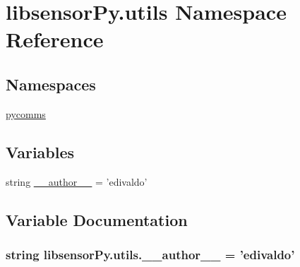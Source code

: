\hypertarget{namespacelibsensorPy_1_1utils}{}\section{libsensor\+Py.\+utils Namespace Reference}
\label{namespacelibsensorPy_1_1utils}
\subsection*{Namespaces}
\begin{DoxyCompactItemize}
\item 
 \hyperlink{namespacelibsensorPy_1_1utils_1_1pycomms}{pycomms}
\end{DoxyCompactItemize}
\subsection*{Variables}
\begin{DoxyCompactItemize}
\item 
string \hyperlink{namespacelibsensorPy_1_1utils_ac6391b5cff3b17c585ec0974798e3fd5}{\+\_\+\+\_\+author\+\_\+\+\_\+} = 'edivaldo'
\end{DoxyCompactItemize}


\subsection{Variable Documentation}
\hypertarget{namespacelibsensorPy_1_1utils_ac6391b5cff3b17c585ec0974798e3fd5}{}
\subsubsection[{\+\_\+\+\_\+author\+\_\+\+\_\+}]{\setlength{\rightskip}{0pt plus 5cm}string libsensor\+Py.\+utils.\+\_\+\+\_\+author\+\_\+\+\_\+ = 'edivaldo'}\label{namespacelibsensorPy_1_1utils_ac6391b5cff3b17c585ec0974798e3fd5}
